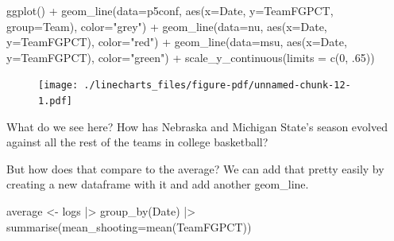 \documentclass[
  letterpaper,
  DIV=11,
  numbers=noendperiod]{scrreprt}
\newenvironment{Shaded}{\begin{snugshade}}{\end{snugshade}}
\newcommand{\AttributeTok}[1]{\textcolor[rgb]{0.40,0.45,0.13}{#1}}
\newcommand{\DecValTok}[1]{\textcolor[rgb]{0.68,0.00,0.00}{#1}}
\newcommand{\FunctionTok}[1]{\textcolor[rgb]{0.28,0.35,0.67}{#1}}
\newcommand{\NormalTok}[1]{\textcolor[rgb]{0.00,0.23,0.31}{#1}}
\newcommand{\OtherTok}[1]{\textcolor[rgb]{0.00,0.23,0.31}{#1}}
\newcommand{\SpecialCharTok}[1]{\textcolor[rgb]{0.37,0.37,0.37}{#1}}
\newcommand{\StringTok}[1]{\textcolor[rgb]{0.13,0.47,0.30}{#1}}
\begin{document}
\begin{Shaded}
\begin{Highlighting}[]
\FunctionTok{ggplot}\NormalTok{() }\SpecialCharTok{+} 
  \FunctionTok{geom\_line}\NormalTok{(}\AttributeTok{data=}\NormalTok{p5conf, }\FunctionTok{aes}\NormalTok{(}\AttributeTok{x=}\NormalTok{Date, }\AttributeTok{y=}\NormalTok{TeamFGPCT, }\AttributeTok{group=}\NormalTok{Team), }\AttributeTok{color=}\StringTok{"grey"}\NormalTok{) }\SpecialCharTok{+} 
  \FunctionTok{geom\_line}\NormalTok{(}\AttributeTok{data=}\NormalTok{nu, }\FunctionTok{aes}\NormalTok{(}\AttributeTok{x=}\NormalTok{Date, }\AttributeTok{y=}\NormalTok{TeamFGPCT), }\AttributeTok{color=}\StringTok{"red"}\NormalTok{) }\SpecialCharTok{+} 
  \FunctionTok{geom\_line}\NormalTok{(}\AttributeTok{data=}\NormalTok{msu, }\FunctionTok{aes}\NormalTok{(}\AttributeTok{x=}\NormalTok{Date, }\AttributeTok{y=}\NormalTok{TeamFGPCT), }\AttributeTok{color=}\StringTok{"green"}\NormalTok{) }\SpecialCharTok{+} 
  \FunctionTok{scale\_y\_continuous}\NormalTok{(}\AttributeTok{limits =} \FunctionTok{c}\NormalTok{(}\DecValTok{0}\NormalTok{, .}\DecValTok{65}\NormalTok{))}
\end{Highlighting}
\end{Shaded}

\begin{figure}[H]

{\centering \texttt{[image: ./linecharts\_files/figure-pdf/unnamed-chunk-12-1.pdf]}

}

\end{figure}

What do we see here? How has Nebraska and Michigan State's season
evolved against all the rest of the teams in college basketball?

But how does that compare to the average? We can add that pretty easily
by creating a new dataframe with it and add another geom\_line.

\begin{Shaded}
\begin{Highlighting}[]
\NormalTok{average }\OtherTok{\textless{}{-}}\NormalTok{ logs }\SpecialCharTok{|\textgreater{}} \FunctionTok{group\_by}\NormalTok{(Date) }\SpecialCharTok{|\textgreater{}} \FunctionTok{summarise}\NormalTok{(}\AttributeTok{mean\_shooting=}\FunctionTok{mean}\NormalTok{(TeamFGPCT))}
\end{Highlighting}
\end{Shaded}
\end{document}
